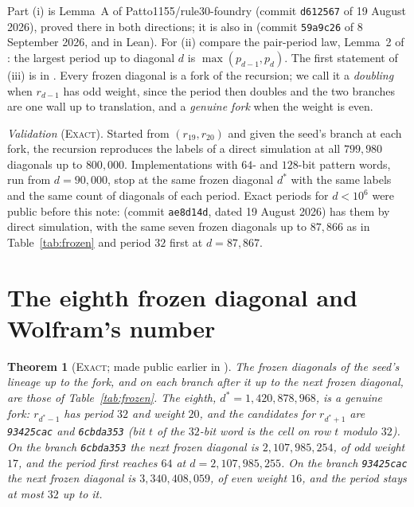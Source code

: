 \documentclass[11pt]{article}
\newtheorem{theorem}{Theorem}[section]
\theoremstyle{definition}
\theoremstyle{remark}
\newcommand{\EXACT}{\textsc{Exact}}
\newcommand{\dstar}{d^{*}}
\begin{document}
Part (i) is Lemma~A of Patto1155/rule30-foundry \cite{Pat2} (commit \texttt{d612567} of 19 August 2026), proved there in both directions; it is also in \cite{Dib2} (commit \texttt{59a9c26} of 8 September 2026, and in Lean). For (ii) compare the pair-period law, Lemma~2 of \cite{Ner}: the largest period up to diagonal $d$ is $\max(p_{d-1},p_d)$. The first statement of (iii) is in \cite[\S8]{GG}. Every frozen diagonal is a fork of the recursion; we call it a \emph{doubling} when $r_{d-1}$ has odd weight, since the period then doubles and the two branches are one wall up to translation, and a \emph{genuine fork} when the weight is even.

\emph{Validation} (\EXACT). Started from $(r_{19},r_{20})$ and given the seed's branch at each fork, the recursion reproduces the labels of a direct simulation at all $799{,}980$ diagonals up to $800{,}000$. Implementations with $64$- and $128$-bit pattern words, run from $d=90{,}000$, stop at the same frozen diagonal $\dstar$ with the same labels and the same count of diagonals of each period. Exact periods for $d<10^{6}$ were public before this note: \cite{Pat2} (commit \texttt{ae8d14d}, dated 19 August 2026) has them by direct simulation, with the same seven frozen diagonals up to $87{,}866$ as in Table~\ref{tab:frozen} and period $32$ first at $d=87{,}867$.

\section{The eighth frozen diagonal and Wolfram's number}

\begin{theorem}[\EXACT; made public earlier in \cite{Dib,Pat}]\label{thm:eighth}
The frozen diagonals of the seed's lineage up to the fork, and on each branch after it up to the next frozen diagonal, are those of Table~\ref{tab:frozen}. The eighth, $\dstar=1{,}420{,}878{,}968$, is a genuine fork: $r_{\dstar-1}$ has period $32$ and weight $20$, and the candidates for $r_{\dstar+1}$ are \texttt{93425cac} and \texttt{6cbda353} (bit $t$ of the $32$-bit word is the cell on row $t$ modulo $32$). On the branch \texttt{6cbda353} the next frozen diagonal is $2{,}107{,}985{,}254$, of odd weight $17$, and the period first reaches $64$ at $d=2{,}107{,}985{,}255$. On the branch \texttt{93425cac} the next frozen diagonal is $3{,}340{,}408{,}059$, of even weight $16$, and the period stays at most $32$ up to it.
\end{theorem}
\end{document}
